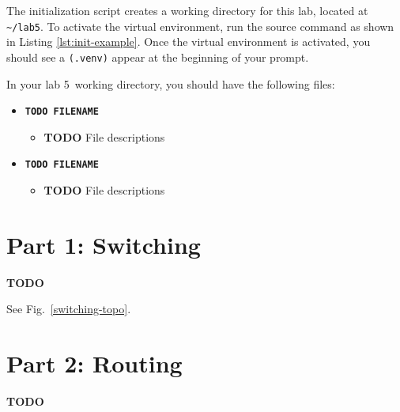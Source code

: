 \documentclass[11pt]{article}
\def\thelab{5}
\begin{document}
The initialization script creates a working directory for this lab, located at \texttt{\textasciitilde/lab\thelab}.
To activate the virtual environment, run the source command as shown in Listing \ref{lst:init-example}.
Once the virtual environment is activated, you should see a \texttt{(.venv)} appear at the beginning of your prompt.



In your lab \thelab~working directory, you should have the following files:
\begin{itemize}
    \item \texttt{\textbf{TODO FILENAME}}
        \begin{itemize}
            \item \textbf{TODO} File descriptions
        \end{itemize}

    \item \texttt{\textbf{TODO FILENAME}}
        \begin{itemize}
            \item \textbf{TODO} File descriptions
        \end{itemize}
\end{itemize}


\section{Part 1: Switching}
\label{sec:exercise}
\textbf{TODO}

See Fig.~\ref{switching-topo}.


\section{Part 2: Routing}
\label{sec:exercise}
\textbf{TODO}
\end{document}
